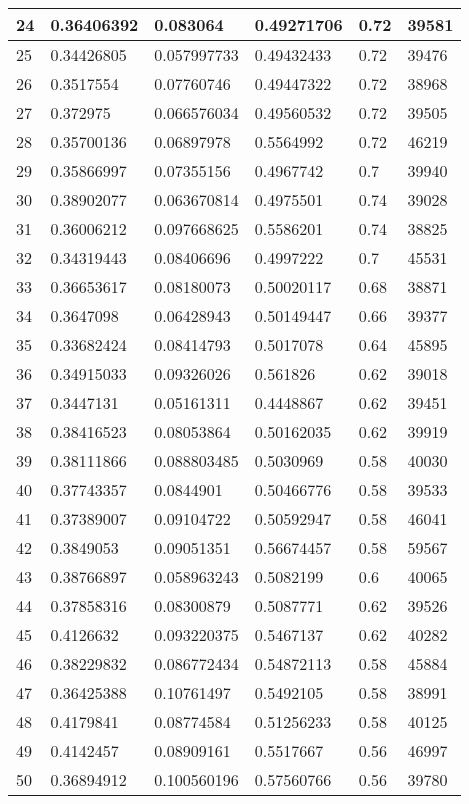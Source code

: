 \begin{longtable}{|l|l|l|l|l|l|}
24 & 0.36406392 & 0.083064 & 0.49271706 & 0.72 & 39581 \\ \hline 
25 & 0.34426805 & 0.057997733 & 0.49432433 & 0.72 & 39476 \\ \hline 
26 & 0.3517554 & 0.07760746 & 0.49447322 & 0.72 & 38968 \\ \hline 
27 & 0.372975 & 0.066576034 & 0.49560532 & 0.72 & 39505 \\ \hline 
28 & 0.35700136 & 0.06897978 & 0.5564992 & 0.72 & 46219 \\ \hline 
29 & 0.35866997 & 0.07355156 & 0.4967742 & 0.7 & 39940 \\ \hline 
30 & 0.38902077 & 0.063670814 & 0.4975501 & 0.74 & 39028 \\ \hline 
31 & 0.36006212 & 0.097668625 & 0.5586201 & 0.74 & 38825 \\ \hline 
32 & 0.34319443 & 0.08406696 & 0.4997222 & 0.7 & 45531 \\ \hline 
33 & 0.36653617 & 0.08180073 & 0.50020117 & 0.68 & 38871 \\ \hline 
34 & 0.3647098 & 0.06428943 & 0.50149447 & 0.66 & 39377 \\ \hline 
35 & 0.33682424 & 0.08414793 & 0.5017078 & 0.64 & 45895 \\ \hline 
36 & 0.34915033 & 0.09326026 & 0.561826 & 0.62 & 39018 \\ \hline 
37 & 0.3447131 & 0.05161311 & 0.4448867 & 0.62 & 39451 \\ \hline 
38 & 0.38416523 & 0.08053864 & 0.50162035 & 0.62 & 39919 \\ \hline 
39 & 0.38111866 & 0.088803485 & 0.5030969 & 0.58 & 40030 \\ \hline 
40 & 0.37743357 & 0.0844901 & 0.50466776 & 0.58 & 39533 \\ \hline 
41 & 0.37389007 & 0.09104722 & 0.50592947 & 0.58 & 46041 \\ \hline 
42 & 0.3849053 & 0.09051351 & 0.56674457 & 0.58 & 59567 \\ \hline 
43 & 0.38766897 & 0.058963243 & 0.5082199 & 0.6 & 40065 \\ \hline 
44 & 0.37858316 & 0.08300879 & 0.5087771 & 0.62 & 39526 \\ \hline 
45 & 0.4126632 & 0.093220375 & 0.5467137 & 0.62 & 40282 \\ \hline 
46 & 0.38229832 & 0.086772434 & 0.54872113 & 0.58 & 45884 \\ \hline 
47 & 0.36425388 & 0.10761497 & 0.5492105 & 0.58 & 38991 \\ \hline 
48 & 0.4179841 & 0.08774584 & 0.51256233 & 0.58 & 40125 \\ \hline 
49 & 0.4142457 & 0.08909161 & 0.5517667 & 0.56 & 46997 \\ \hline 
50 & 0.36894912 & 0.100560196 & 0.57560766 & 0.56 & 39780 \\ \hline 
\end{longtable}